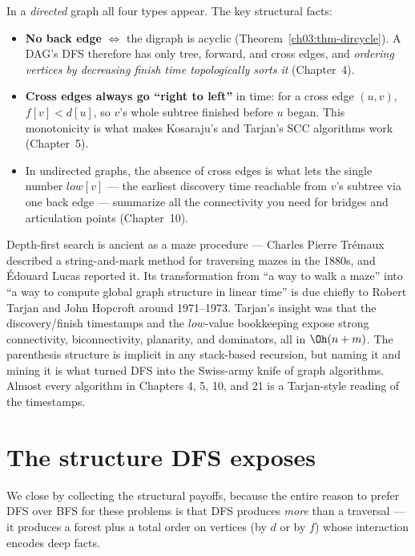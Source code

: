 In a \emph{directed} graph all four types appear. The key structural facts:

\begin{itemize}
  \item \textbf{No back edge} $\iff$ the digraph is acyclic (Theorem~\ref{ch03:thm-dircycle}). A DAG's DFS therefore has only tree, forward, and cross edges, and \emph{ordering vertices by decreasing finish time topologically sorts it} (Chapter~4).
  \item \textbf{Cross edges always go ``right to left''} in time: for a cross edge $(u,v)$, $f[v]<d[u]$, so $v$'s whole subtree finished before $u$ began. This monotonicity is what makes Kosaraju's and Tarjan's SCC algorithms work (Chapter~5).
  \item In undirected graphs, the absence of cross edges is what lets the single number $\mathit{low}[v]$ --- the earliest discovery time reachable from $v$'s subtree via one back edge --- summarize all the connectivity you need for bridges and articulation points (Chapter~10).
\end{itemize}

\begin{historybox}
Depth-first search is ancient as a maze procedure --- Charles Pierre Tr\'emaux described a string-and-mark method for traversing mazes in the 1880s, and \'Edouard Lucas reported it. Its transformation from ``a way to walk a maze'' into ``a way to compute global graph structure in linear time'' is due chiefly to Robert Tarjan and John Hopcroft around 1971--1973. Tarjan's insight was that the discovery/finish timestamps and the $\mathit{low}$-value bookkeeping expose strong connectivity, biconnectivity, planarity, and dominators, all in $\Oh(n+m)$. The parenthesis structure is implicit in any stack-based recursion, but naming it and mining it is what turned DFS into the Swiss-army knife of graph algorithms. Almost every algorithm in Chapters 4, 5, 10, and 21 is a Tarjan-style reading of the timestamps.
\end{historybox}

\section{The structure DFS exposes}
\label{ch03:structure}

We close by collecting the structural payoffs, because the entire reason to prefer DFS over BFS for these problems is that DFS produces \emph{more} than a traversal --- it produces a forest plus a total order on vertices (by $d$ or by $f$) whose interaction encodes deep facts.

